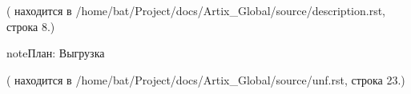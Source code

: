 \documentclass[twoside,11pt,a4paper,notitlepage]{report}
\begin{document}
\sphinxAtStartPar
({\hyperref[\detokenize{description:id2}]{}} находится в /home/bat/Project/docs/Artix\_Global/source/description.rst, строка 8.)

\begin{sphinxadmonition}{note}{План:}
\sphinxAtStartPar
Выгрузка
\end{sphinxadmonition}

\sphinxAtStartPar
({\hyperref[\detokenize{unf:id2}]{}} находится в /home/bat/Project/docs/Artix\_Global/source/unf.rst, строка 23.)



\renewcommand{\indexname}{Алфавитный указатель}
\printindex
\end{document}
